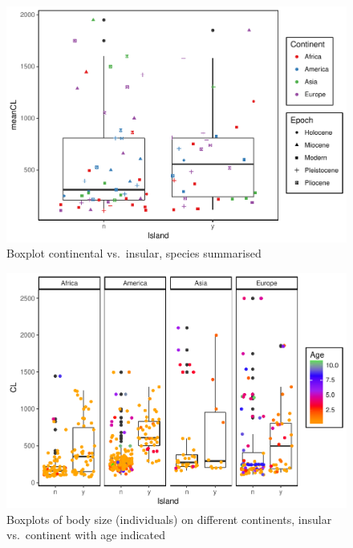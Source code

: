 \documentclass[]{article}
\begin{document}
\begin{figure}[htbp]
\centering
\includegraphics{MA_JJ_files/figure-latex/Boxplot continental vs. insular, species summarised-1.pdf}
\caption{Boxplot continental vs.~insular, species summarised}
\end{figure}

\begin{figure}[htbp]
\centering
\includegraphics{MA_JJ_files/figure-latex/Boxplots continents, insular vs. continent with age indicated-1.pdf}
\caption{Boxplots of body size (individuals) on different continents,
insular vs.~continent with age indicated}
\end{figure}
\end{document}
